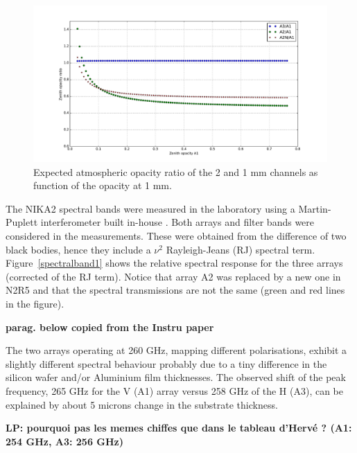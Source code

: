 \begin{figure}[ht] %
\begin{center}
\includegraphics[width=\textwidth]{Figures/SpectralBands/opacity_ratio_vs_tau1.pdf}
\caption{Expected atmospheric opacity ratio of the 2 and 1 mm channels as function of the opacity at 1 mm. \label{thopacities}}
\end{center}
\end{figure}



The NIKA2 spectral bands were measured in the laboratory using a
Martin-Puplett interferometer built in-house \cite{durand}.
Both arrays and filter bands were considered in the
measurements. These were obtained from the difference of two
black bodies, hence they include a $\nu^2$ Rayleigh-Jeans (RJ) spectral term.
Figure~\ref{spectralband1} shows the
relative spectral response for the three arrays (corrected of the RJ
term). Notice that array A2 was replaced by a new one in N2R5 and that
the spectral transmissions are not the same (green and red lines in the
figure).

{\bf parag. below copied from the Instru paper}

The two arrays operating at 260 GHz, mapping different polarisations, exhibit a slightly different
spectral behaviour probably due to a tiny difference in the
silicon wafer and/or Aluminium film thicknesses. The observed
shift of the peak frequency, 265 GHz for the V (A1) array versus
258 GHz of the H (A3), can be explained by about 5 microns
change in the substrate thickness.

{\bf LP: pourquoi pas les memes chiffes que dans le tableau d'Herv\'e ?
  (A1: 254 GHz, A3: 256 GHz)}



